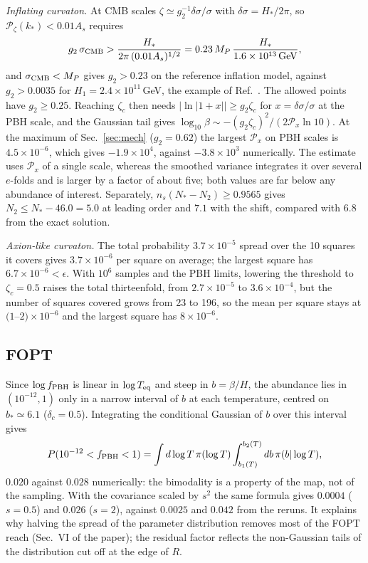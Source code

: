 \documentclass[aps,prd,onecolumn,superscriptaddress,nofootinbib,floatfix]{revtex4-2}
\newcommand{\fpbh}{f_{\rm PBH}}
\newcommand{\Ns}{N_\ast}
\begin{document}
\emph{Inflating curvaton.} At CMB scales $\zeta\simeq g_2^{-1}\delta\sigma/\sigma$ with $\delta\sigma=H_\ast/2\pi$, so $\mathcal{P}_\zeta(k_\ast)<0.01A_s$ requires
\begin{equation}
g_2\,\sigma_{\rm CMB}>\frac{H_\ast}{2\pi\,(0.01A_s)^{1/2}}=0.23\,M_P\,\frac{H_\ast}{1.6\times10^{13}\,{\rm GeV}},
\end{equation}
and $\sigma_{\rm CMB}<M_P$ gives $g_2>0.23$ on the reference inflation model, against $g_2>0.0035$ for $H_1=2.4\times10^{11}$\,GeV, the example of Ref.~\cite{Kohri:2012yw}. The allowed points have $g_2\ge0.25$. Reaching $\zeta_c$ then needs $|\ln|1+x||\ge g_2\zeta_c$ for $x=\delta\sigma/\sigma$ at the PBH scale, and the Gaussian tail gives $\log_{10}\beta\sim-(g_2\zeta_c)^2/(2\mathcal{P}_x\ln10)$. At the maximum of Sec.~\ref{sec:mech} ($g_2=0.62$) the largest $\mathcal{P}_x$ on PBH scales is $4.5\times10^{-6}$, which gives $-1.9\times10^{4}$, against $-3.8\times10^{3}$ numerically. The estimate uses $\mathcal{P}_x$ of a single scale, whereas the smoothed variance integrates it over several $e$-folds and is larger by a factor of about five; both values are far below any abundance of interest. Separately, $n_s(\Ns-N_2)\ge0.9565$ gives $N_2\le\Ns-46.0=5.0$ at leading order and $7.1$ with the shift, compared with $6.8$ from the exact solution.

\emph{Axion-like curvaton.} The total probability $3.7\times10^{-5}$ spread over the 10 squares it covers gives $3.7\times10^{-6}$ per square on average; the largest square has $6.7\times10^{-6}<\epsilon$. With $10^{6}$ samples and the PBH limits, lowering the threshold to $\zeta_c=0.5$ raises the total thirteenfold, from $2.7\times10^{-5}$ to $3.6\times10^{-4}$, but the number of squares covered grows from 23 to 196, so the mean per square stays at $(1$--$2)\times10^{-6}$ and the largest square has $8\times10^{-6}$.

\subsection{FOPT}

Since $\log\fpbh$ is linear in $\log T_{\rm eq}$ and steep in $b=\beta/H$, the abundance lies in $(10^{-12},1)$ only in a narrow interval of $b$ at each temperature, centred on $b_\ast\simeq6.1$ ($\delta_c=0.5$). Integrating the conditional Gaussian of $b$ over this interval gives
\begin{equation}
P(10^{-12}<\fpbh<1)=\int d\log T\,\pi(\log T)\int_{b_1(T)}^{b_2(T)}db\,\pi(b|\log T),
\end{equation}
$0.020$ against $0.028$ numerically: the bimodality is a property of the map, not of the sampling. With the covariance scaled by $s^2$ the same formula gives $0.0004$ ($s=0.5$) and $0.026$ ($s=2$), against $0.0025$ and $0.042$ from the reruns. It explains why halving the spread of the parameter distribution removes most of the FOPT reach (Sec.~VI of the paper); the residual factor reflects the non-Gaussian tails of the distribution cut off at the edge of $R$.
\end{document}
